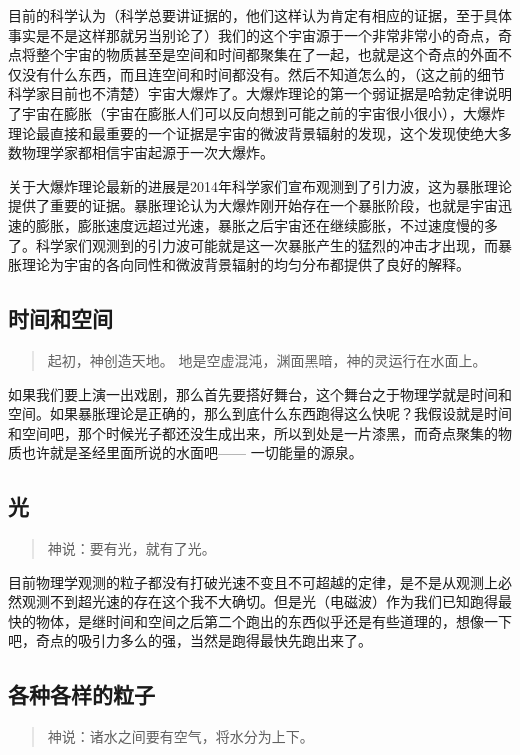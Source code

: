 \documentclass[11pt,oneside]{article}
\begin{document}
目前的科学认为（科学总要讲证据的，他们这样认为肯定有相应的证据，至于具体事实是不是这样那就另当别论了）我们的这个宇宙源于一个非常非常小的奇点，奇点将整个宇宙的物质甚至是空间和时间都聚集在了一起，也就是这个奇点的外面不仅没有什么东西，而且连空间和时间都没有。然后不知道怎么的，（这之前的细节科学家目前也不清楚）宇宙大爆炸了。大爆炸理论的第一个弱证据是哈勃定律说明了宇宙在膨胀（宇宙在膨胀人们可以反向想到可能之前的宇宙很小很小），大爆炸理论最直接和最重要的一个证据是宇宙的微波背景辐射的发现，这个发现使绝大多数物理学家都相信宇宙起源于一次大爆炸。

关于大爆炸理论最新的进展是2014年科学家们宣布观测到了引力波，这为暴胀理论提供了重要的证据。暴胀理论认为大爆炸刚开始存在一个暴胀阶段，也就是宇宙迅速的膨胀，膨胀速度远超过光速，暴胀之后宇宙还在继续膨胀，不过速度慢的多了。科学家们观测到的引力波可能就是这一次暴胀产生的猛烈的冲击才出现，而暴胀理论为宇宙的各向同性和微波背景辐射的均匀分布都提供了良好的解释。

\subsection{时间和空间}
\label{sec-2-1}
\begin{quote}
起初，神创造天地。
地是空虚混沌，渊面黑暗，神的灵运行在水面上。 
\end{quote}


如果我们要上演一出戏剧，那么首先要搭好舞台，这个舞台之于物理学就是时间和空间。如果暴胀理论是正确的，那么到底什么东西跑得这么快呢？我假设就是时间和空间吧，那个时候光子都还没生成出来，所以到处是一片漆黑，而奇点聚集的物质也许就是圣经里面所说的水面吧—— 一切能量的源泉。


\subsection{光}
\label{sec-2-2}
\begin{quote}
神说：要有光，就有了光。 
\end{quote}


目前物理学观测的粒子都没有打破光速不变且不可超越的定律，是不是从观测上必然观测不到超光速的存在这个我不大确切。但是光（电磁波）作为我们已知跑得最快的物体，是继时间和空间之后第二个跑出的东西似乎还是有些道理的，想像一下吧，奇点的吸引力多么的强，当然是跑得最快先跑出来了。


\subsection{各种各样的粒子}
\label{sec-2-3}
\begin{quote}
神说：诸水之间要有空气，将水分为上下。 
\end{quote}
\end{document}
